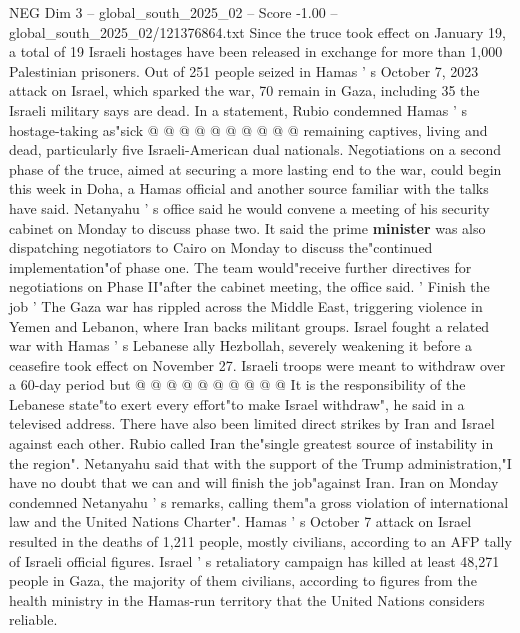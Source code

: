 \begin{textsample}{NEG Dim 3 – global\_south\_2025\_02 – Score -1.00 – global\_south\_2025\_02/121376864.txt}
Since the truce took effect on January 19, a total of 19 Israeli hostages have been released in exchange for more than 1,000 Palestinian prisoners.
Out of 251 people seized in Hamas ' s October 7, 2023 attack on Israel, which sparked the war, 70 remain in Gaza, including 35 the Israeli military says are dead.
In a statement, Rubio condemned Hamas ' s hostage-taking as"sick @ @ @ @ @ @ @ @ @ @ remaining captives, living and dead, particularly five Israeli-American dual nationals.
Negotiations on a second phase of the truce, aimed at securing a more lasting end to the war, could begin this week in Doha, a Hamas official and another source familiar with the talks have said.
Netanyahu ' s office said he would convene a meeting of his security cabinet on Monday to discuss phase two.
It said the prime \textbf{minister} was also dispatching negotiators to Cairo on Monday to discuss the"continued implementation"of phase one.
The team would"receive further directives for negotiations on Phase II"after the cabinet meeting, the office said. ' Finish the job ' The Gaza war has rippled across the Middle East, triggering violence in Yemen and Lebanon, where Iran backs militant groups.
Israel fought a related war with Hamas ' s Lebanese ally Hezbollah, severely weakening it before a ceasefire took effect on November 27.
Israeli troops were meant to withdraw over a 60-day period but @ @ @ @ @ @ @ @ @ @ It is the responsibility of the Lebanese state"to exert every effort"to make Israel withdraw", he said in a televised address.
There have also been limited direct strikes by Iran and Israel against each other.
Rubio called Iran the"single greatest source of instability in the region".
Netanyahu said that with the support of the Trump administration,"I have no doubt that we can and will finish the job"against Iran.
Iran on Monday condemned Netanyahu ' s remarks, calling them"a gross violation of international law and the United Nations Charter".
Hamas ' s October 7 attack on Israel resulted in the deaths of 1,211 people, mostly civilians, according to an AFP tally of Israeli official figures.
Israel ' s retaliatory campaign has killed at least 48,271 people in Gaza, the majority of them civilians, according to figures from the health ministry in the Hamas-run territory that the United Nations considers reliable.

\end{textsample}
